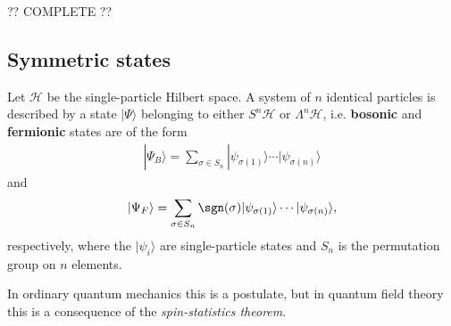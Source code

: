     ?? COMPLETE ??

\subsection{Symmetric states}

    \begin{axiom}
        Let $\mathcal{H}$ be the single-particle Hilbert space. A system of $n$ identical particles is described by a state $|\Psi\rangle$ belonging to either $S^n\mathcal{H}$ or $\Lambda^n\mathcal{H}$, i.e. \textbf{bosonic} and \textbf{fermionic} states are of the form
        \begin{gather}
            |\Psi_B\rangle = \sum_{\sigma\in S_n}|\psi_{\sigma(1)}\rangle\cdots|\psi_{\sigma(n)}\rangle
        \end{gather}
        and
        \begin{gather}
            |\Psi_F\rangle = \sum_{\sigma\in S_n}\sgn(\sigma)|\psi_{\sigma(1)}\rangle\cdots|\psi_{\sigma(n)}\rangle,
        \end{gather}
        respectively, where the $|\psi_i\rangle$ are single-particle states and $S_n$ is the permutation group on $n$ elements.
    \end{axiom}
    \begin{remark}
        In ordinary quantum mechanics this is a postulate, but in quantum field theory this is a consequence of the \textit{spin-statistics theorem}.
    \end{remark}


